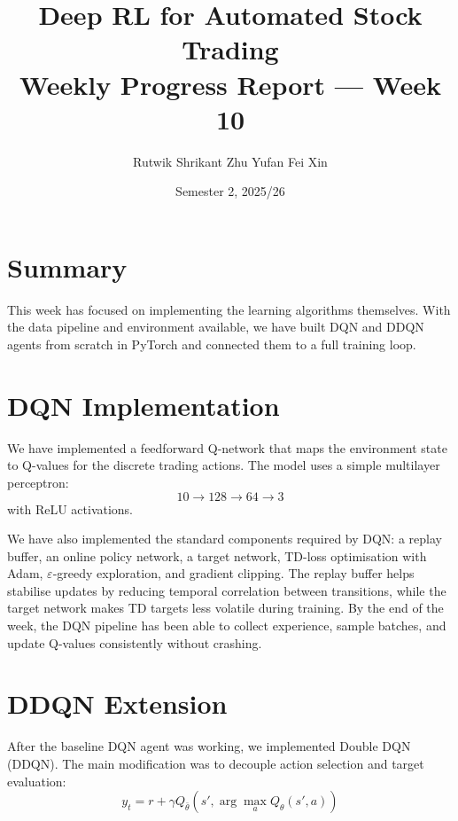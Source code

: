 \documentclass[11pt,twocolumn]{article}
\title{\textbf{Deep RL for Automated Stock Trading}\\[4pt]
\large Weekly Progress Report --- Week 10}
\author{
Rutwik Shrikant \quad
Zhu Yufan \quad
Fei Xin
}
\date{Semester 2, 2025/26}
\begin{document}
\maketitle

\section{Summary}

This week has focused on implementing the learning algorithms themselves. With the data pipeline and environment available, we have built DQN and DDQN agents from scratch in PyTorch and connected them to a full training loop.

\section{DQN Implementation}

We have implemented a feedforward Q-network that maps the environment state to Q-values for the discrete trading actions. The model uses a simple multilayer perceptron:
\begin{equation}
  10 \rightarrow 128 \rightarrow 64 \rightarrow 3
\end{equation}
with ReLU activations.

We have also implemented the standard components required by DQN: a replay buffer, an online policy network, a target network, TD-loss optimisation with Adam, $\varepsilon$-greedy exploration, and gradient clipping. The replay buffer helps stabilise updates by reducing temporal correlation between transitions, while the target network makes TD targets less volatile during training. By the end of the week, the DQN pipeline has been able to collect experience, sample batches, and update Q-values consistently without crashing.

\section{DDQN Extension}

After the baseline DQN agent was working, we implemented Double DQN (DDQN). The main modification was to decouple action selection and target evaluation:
\begin{equation}
  y_t = r + \gamma Q_{\bar{\theta}}(s', \arg\max_a Q_\theta(s', a))
\end{equation}
\end{document}

